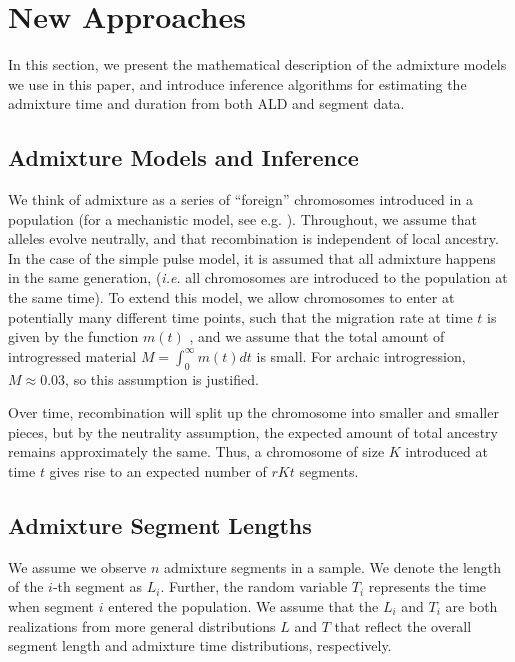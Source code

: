 \documentclass[11pt]{article}
\begin{document}
\section{New Approaches}\label{new approaches}

In this section, we present the mathematical description of the admixture models we use in this paper, and introduce inference algorithms for estimating the admixture time and duration from both ALD and segment data. 


\subsection{Admixture Models and Inference}\label{admixture models}
	
We think of admixture as a series of ``foreign'' chromosomes introduced in a population (for a mechanistic model, see e.g. \cite{pool_inference_2009}). Throughout, we assume that alleles evolve neutrally, and that recombination is independent of local ancestry. In the case of the simple pulse model, it is assumed that all admixture happens in the same generation, (\textit{i.e.} all chromosomes are introduced to the population at the same time). To extend this model, we allow chromosomes to enter at potentially many different time points, such that the migration rate at time $t$ is given by the function $m(t)$ \citep{pool_inference_2009}, and we assume that the total amount of introgressed material $M=\int_0^\infty m(t)dt$ is small. For archaic introgression, $M \approx 0.03$, so this assumption is justified.

Over time, recombination will split up the chromosome into smaller and smaller pieces, but by the neutrality assumption, the expected amount of total ancestry remains approximately the same. Thus, a chromosome of size $K$ introduced at time $t$ gives rise to an expected number of $rKt$ segments.


\subsection{Admixture Segment Lengths}
We assume we observe $n$ admixture segments in a sample. We denote the length of the $i$-th segment as $L_i$. Further, the random variable $T_i$ represents the time when segment $i$ entered the population. We assume that the $L_i$ and $T_i$ are both realizations from more general distributions $L$ and $T$ that reflect the overall segment length and admixture time distributions, respectively. 
\end{document}
